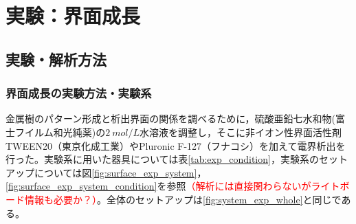 \documentclass[autodetect-engine,dvi=dvipdfmx,a4paper,ja=standard,oneside,openany,11pt,draft]{bxjsbook}
\begin{document}
\chapter{実験：界面成長}
\section{実験・解析方法}
\subsection{界面成長の実験方法・実験系}
金属樹のパターン形成と析出界面の関係を調べるために，硫酸亜鉛七水和物(富士フイルム和光純薬)の$\SI{2}{mol/L}$水溶液を調整し，そこに非イオン性界面活性剤TWEEN20（東京化成工業）やPluronic F-127（フナコシ）を加えて電界析出を行った。実験系に用いた器具については表\ref{tab:exp_condition}，実験系のセットアップについては図\ref{fig:surface_exp_system}，\ref{fig:surface_exp_system_condition}を参照\textcolor{red}{（解析には直接関わらないがライトボード情報も必要か？）}。全体のセットアップは\ref{fig:system_exp_whole}と同じである。
\end{document}
